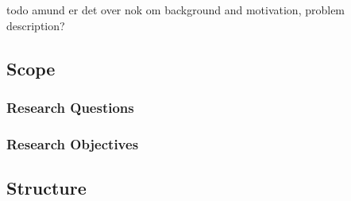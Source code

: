 todo amund er det over nok om background and motivation, problem description?

\subsection{Scope}

\subsubsection{Research Questions}

\subsubsection{Research Objectives}

\subsection{Structure}
